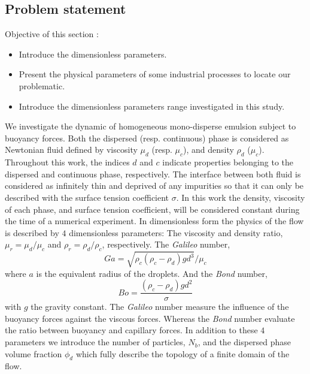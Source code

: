 

\subsection{Problem statement}
Objective of this section :
\begin{itemize}
    \item Introduce the dimensionless parameters.
    \item Present the physical parameters of some industrial processes to locate our problematic. 
    \item Introduce the dimensionless parameters range investigated in this study.
\end{itemize}
We investigate the dynamic of homogeneous mono-disperse emulsion subject to buoyancy forces. 
Both the dispersed (resp. continuous) phase is considered as Newtonian fluid defined by viscosity $\mu_d$ (resp. $\mu_c$), and density $\rho_d$ ($\mu_c$).
Throughout this work, the indices $d$ and $c$ indicate properties belonging to the dispersed and continuous phase, respectively. 
The interface between both fluid is considered as infinitely thin and deprived of any impurities so that it can only be described with the surface tension coefficient $\sigma$. 
In this work the density, viscosity of each phase, and surface tension coefficient, will be considered constant during  the time of a numerical experiment.
In dimensionless form the physics of the flow is described by $4$ dimensionless parameters: 
The viscosity and density ratio, $\mu_r = \mu_d / \mu_c$ and $\rho_r = \rho_d / \rho_c$, respectively. 
The \textit{Galileo} number, 
\begin{equation*}
    Ga =\sqrt{\rho_c(\rho_c - \rho_d) g d^3} / \mu_c
\end{equation*}
where $a$ is the equivalent radius of the droplets.
And the \textit{Bond} number, 
\begin{equation*}
    Bo =\frac{(\rho_c - \rho_d) g d^2}{\sigma}
\end{equation*}
with $g$ the gravity constant. 
The \textit{Galileo} number measure the influence of the buoyancy forces against the viscous forces.
Whereas the \textit{Bond} number evaluate the ratio between buoyancy and capillary forces. 
In addition to these $4$ parameters we introduce the number of particles, $N_b$, and the dispersed phase volume fraction $\phi_d$ which fully describe the topology of a finite domain of the flow. 


